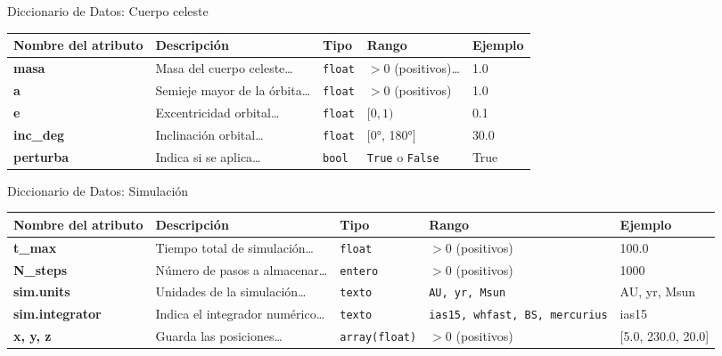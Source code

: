 \begin{frame}{Diccionario de Datos: Cuerpo celeste}
  \centering
  \label{tab:diccionario_cuerpos_slide}
  \begin{adjustbox}{max width=0.9\textwidth}
    \begin{tabular}{@{}p{3cm} p{4cm} p{1.5cm} p{1.5cm} p{2.5cm}@{}}
      \toprule
      \textbf{Nombre del atributo} & \textbf{Descripción} & \textbf{Tipo} & \textbf{Rango} & \textbf{Ejemplo} \\
      \midrule
      \textbf{masa} & Masa del cuerpo celeste\ldots & \texttt{float} & \(>0\) (positivos)\ldots & 1.0 \\
      \midrule
      \textbf{a} & Semieje mayor de la órbita\ldots & \texttt{float} & \(>0\) (positivos) & 1.0 \\
      \midrule
      \textbf{e} & Excentricidad orbital\ldots & \texttt{float} & $[0, 1)$ & 0.1 \\
      \midrule
      \textbf{inc\_deg} & Inclinación orbital\ldots & \texttt{float} & [0°, 180°] & 30.0 \\
      \midrule
      \textbf{perturba} & Indica si se aplica\ldots & \texttt{bool} & \texttt{True} o \texttt{False} & True \\
      \bottomrule
    \end{tabular}
  \end{adjustbox}
\end{frame}

\begin{frame}{Diccionario de Datos: Simulación}
  \centering
  \label{tab:diccionario_simulación_slide}
  \begin{adjustbox}{max width=0.9\textwidth}
    \begin{tabular}{@{}p{3cm} p{4cm} p{1.5cm} p{1.5cm} p{2.5cm}@{}}
      \toprule
      \textbf{Nombre del atributo} & \textbf{Descripción} & \textbf{Tipo} & \textbf{Rango} & \textbf{Ejemplo} \\
      \midrule
      \textbf{t\_max} & Tiempo total de simulación\ldots & \texttt{float} & \( > 0 \) (positivos) & 100.0 \\
      \midrule
      \textbf{N\_steps} & Número de pasos a almacenar\ldots & \texttt{entero} & \(>0\) (positivos) & 1000 \\
      \midrule
      \textbf{sim.units} & Unidades de la simulación\ldots & \texttt{texto} & \texttt{AU, yr, Msun} & AU, yr, Msun \\
      \midrule
      \textbf{sim.integrator} & Indica el integrador numérico\ldots & \texttt{texto} & \texttt{ias15, whfast, BS, mercurius} & ias15 \\
      \midrule
      \textbf{x, y, z} & Guarda las posiciones\ldots & \texttt{array(float)} & \(>0\) (positivos) & [5.0, 230.0, 20.0] \\
      \bottomrule
    \end{tabular}
  \end{adjustbox}
\end{frame}

